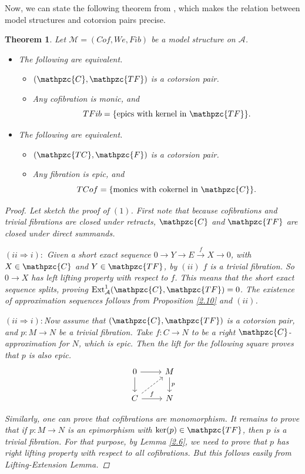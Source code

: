 \documentclass[12pt]{amsart}
\numberwithin{equation}{section}
\newtheorem{theorem}[lemma]{Theorem}
\theoremstyle{definition}
\DeclareMathOperator{\Ext}{Ext}
\newtheorem*{theorem 0*}{Theorem}
\newtheorem*{theorem a*}{Theorem A}
\newtheorem*{theorem b*}{Theorem B}
\numberwithin{diagram}{section}
\begin{document}
	Now, we can state the following theorem from \cite{BR,CLZ}, which makes the relation between model structures and cotorsion pairs precise.
	
	\begin{theorem}\label{2.13}
	Let $\mathcal{M}=(Cof,We,Fib)$ be a model structure on $\mathcal{A}$.
	\begin{itemize}
	\item[(1)] The following are equivalent.
          \begin{itemize}
          \item[(i)]
          $(\mathpzc{C},\mathpzc{TF})$ is a cotorsion pair.
          \item[(ii)]
          Any cofibration is monic, and
	   \[TFib=\{\text{epics with kernel in } \mathpzc{TF}\}.\]
          \end{itemize}
	\item[(2)] The following are equivalent.
       \begin{itemize}
       \item[(i)]
       $(\mathpzc{TC},\mathpzc{F})$ is a cotorsion pair.
       \item[(ii)]
       Any fibration is epic, and
	   \[TCof=\{\text{monics with cokernel in } \mathpzc{C}\}.\]
       \end{itemize}
	\end{itemize}
    \begin{proof}
    Let sketch the proof of $(1)$.
    First note that because cofibrations and trivial fibrations are closed under retracts, $\mathpzc{C}$ and $\mathpzc{TF}$ are closed under direct summands.
  
  $(ii\Rightarrow i):$ Given a short exact sequence $0\rightarrow Y\rightarrow E\overset{f}{\rightarrow} X\rightarrow 0$, with $X\in\mathpzc{C}$ and $Y\in\mathpzc{TF}$, by $(ii)$ $f$ is a trivial fibration. So $0\rightarrow X$ has left lifting property with respect to $f$. This means that the short exact sequence splits, proving $\Ext_{\mathcal{A}}^1(\mathpzc{C},\mathpzc{TF})=0$.
The existence of approximation sequences follows from Proposition \ref{2.10} and $(ii)$.
    
$(ii\Rightarrow i):$Now assume that $(\mathpzc{C},\mathpzc{TF})$ is a cotorsion pair, and $p:M\rightarrow N$ be a trivial fibration. Take $f:C\rightarrow N$ to be a right $\mathpzc{C}$-approximation for $N$, which is epic. Then the lift for the following square proves that $p$ is also epic.
    \[\begin{tikzcd}
	0 & M \\
	C & N
	\arrow[from=1-1, to=1-2]
	\arrow[from=1-1, to=2-1]
	\arrow["p", from=1-2, to=2-2]
	\arrow[dashed, from=2-1, to=1-2]
	\arrow["f", from=2-1, to=2-2]
\end{tikzcd}\]

 Similarly, one can prove that cofibrations are monomorphism. It remains to prove that if $p:M\rightarrow N$ is an epimorphism with  $\ker(p)\in\mathpzc{TF}$, then $p$ is a trivial fibration. For that purpose, by Lemma \ref{2.6}, we need to prove that $p$ has right lifting property with respect to all cofibrations. But this follows easily from Lifting-Extension Lemma.
    \end{proof}
	\end{theorem}
	
\end{document}
